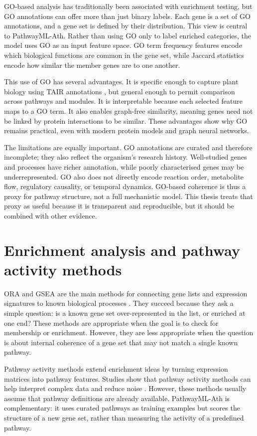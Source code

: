 \documentclass[12pt,letterpaper,oneside,openany]{book}
\begin{document}
GO-based analysis has traditionally been associated with enrichment testing, but GO annotations can offer more than just binary labels. Each gene is a set of GO annotations, and a gene set is defined by their distribution. This view is central to PathwayML-Ath. Rather than using GO only to label enriched categories, the model uses GO as an input feature space. GO term frequency features encode which biological functions are common in the gene set, while Jaccard statistics encode how similar the member genes are to one another.

This use of GO has several advantages. It is specific enough to capture plant biology using TAIR annotations \citep{berardini2015tair}, but general enough to permit comparison across pathways and modules. It is interpretable because each selected feature maps to a GO term. It also enables graph-free similarity, meaning genes need not be linked by protein interactions to be similar. These advantages show why GO remains practical, even with modern protein models and graph neural networks.

The limitations are equally important. GO annotations are curated and therefore incomplete; they also reflect the organism's research history. Well-studied genes and processes have richer annotation, while poorly characterised genes may be underrepresented. GO also does not directly encode reaction order, metabolite flow, regulatory causality, or temporal dynamics. GO-based coherence is thus a proxy for pathway structure, not a full mechanistic model. This thesis treats that proxy as useful because it is transparent and reproducible, but it should be combined with other evidence.

\section{Enrichment analysis and pathway activity methods}
\label{sec:lit_enrichment_extended}

ORA and GSEA are the main methods for connecting gene lists and expression signatures to known biological processes \citep{subramanian2005gsea,khatri2012ten}. They succeed because they ask a simple question: is a known gene set over-represented in the list, or enriched at one end? These methods are appropriate when the goal is to check for membership or enrichment. However, they are less appropriate when the question is about internal coherence of a gene set that may not match a single known pathway.

Pathway activity methods extend enrichment ideas by turning expression matrices into pathway features. Studies show that pathway activity methods can help interpret complex data and reduce noise \citep{zhang2020pathway}. However, these methods usually assume that pathway definitions are already available. PathwayML-Ath is complementary: it uses curated pathways as training examples but scores the structure of a new gene set, rather than measuring the activity of a predefined pathway.
\end{document}
